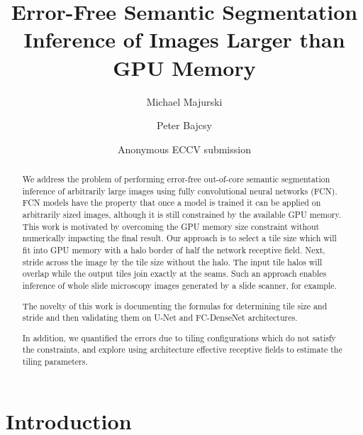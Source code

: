 \documentclass[runningheads]{llncs}
\title{Error-Free Semantic Segmentation Inference of Images Larger than GPU Memory}
\author{Michael Majurski\inst{1} \and Peter Bajcsy\inst{1}}
\institute{National Institute of Standards and Technology\\
	Information Technology Lab\\
	Gaithersburg, MD 20899, USA\\
	\email{\{michael.majurski,peter.bajcsy\}@nist.gov}}
\author{Anonymous ECCV submission}
\institute{Paper ID \ECCVSubNumber}
\begin{document}
\maketitle
 
\begin{abstract}

We address the problem of performing error-free out-of-core semantic segmentation inference of arbitrarily large images using fully convolutional neural networks (FCN). FCN models have the property that once a model is trained it can be applied on arbitrarily sized images, although it is still constrained by the available GPU memory. This work is motivated by overcoming the GPU memory size constraint without numerically impacting the final result. 
Our approach is to select a tile size which will fit into GPU memory with a halo border of half the network receptive field. Next, stride across the image by the tile size without the halo. The input tile halos will overlap while the output tiles join exactly at the seams. Such an approach enables inference of whole slide microscopy images generated by a slide scanner, for example.

The novelty of this work is documenting the formulas for determining tile size and stride and then validating them on U-Net and FC-DenseNet architectures.

In addition, we quantified the errors due to tiling configurations which do not satisfy the constraints, and explore using architecture effective receptive fields to estimate the tiling parameters. 


\end{abstract}

\section{Introduction}
\end{document}

